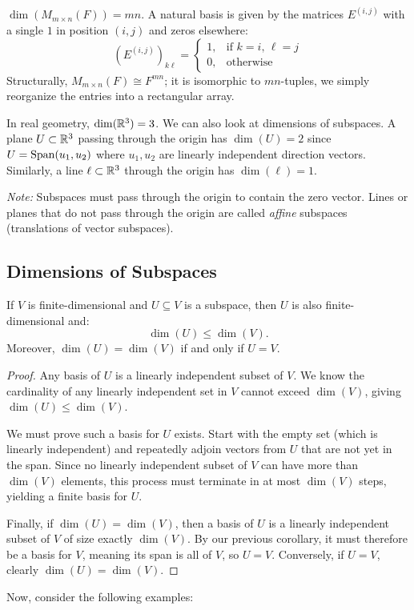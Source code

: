 \documentclass[../linear_algebra_and_groups.tex]{subfiles}
\begin{document}
\begin{example}
    $\dim(M_{m\times n}(F))=mn$. A natural basis is given by the matrices $E^{(i,j)}$ with a single $1$ in position $(i,j)$ and zeros elsewhere: 
    \[ \left(E^{(i,j)}\right)_{k\ell}=\begin{cases}1,&\text{if }k=i,\,\ell=j\\0,&\text{otherwise}\end{cases} \]
    Structurally, $M_{m\times n}(F) \cong F^{mn}$; it is isomorphic to $mn$-tuples, we simply reorganize the entries into a rectangular array.
\end{example}

\begin{example}
    In real geometry, $\dim(\mathbb{R}^3)=3$. We can also look at dimensions of subspaces. A plane $U\subset \mathbb{R}^3$ passing through the origin has $\dim(U)=2$ since $U=\operatorname{Span}(u_1,u_2)$ where $u_1,u_2$ are linearly independent direction vectors. Similarly, a line $\ell\subset\mathbb{R}^3$ through the origin has $\dim(\ell)=1$. 
    
    \textit{Note:} Subspaces must pass through the origin to contain the zero vector. Lines or planes that do not pass through the origin are called \textit{affine} subspaces (translations of vector subspaces). 
\end{example}


\subsection{Dimensions of Subspaces}

\begin{proposition}
\label{prop:subspacedim}
    \begin{shaded*}
        If $V$ is finite-dimensional and $U\subseteq V$ is a subspace, then $U$ is also finite-dimensional and:
        \[ \dim(U) \le \dim(V). \]
        Moreover, $\dim(U)=\dim(V)$ if and only if $U=V$.
    \end{shaded*}
\end{proposition}
\begin{proof}
    Any basis of $U$ is a linearly independent subset of $V$. We know the cardinality of any linearly independent set in $V$ cannot exceed $\dim(V)$, giving $\dim(U)\le \dim(V)$.
    
    We must prove such a basis for $U$ exists. Start with the empty set (which is linearly independent) and repeatedly adjoin vectors from $U$ that are not yet in the span. Since no linearly independent subset of $V$ can have more than $\dim(V)$ elements, this process must terminate in at most $\dim(V)$ steps, yielding a finite basis for $U$.
    
    Finally, if $\dim(U)=\dim(V)$, then a basis of $U$ is a linearly independent subset of $V$ of size exactly $\dim(V)$. By our previous corollary, it must therefore be a basis for $V$, meaning its span is all of $V$, so $U=V$. Conversely, if $U=V$, clearly $\dim(U)=\dim(V)$.\qedhere
\end{proof}
Now, consider the following examples:
\end{document}
